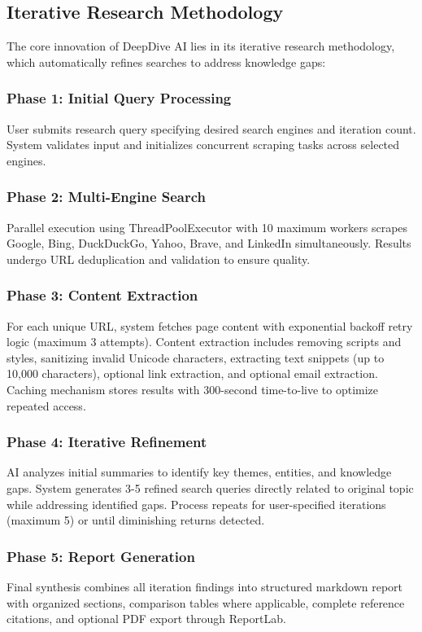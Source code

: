\documentclass[conference]{IEEEtran}
\begin{document}
\subsection{Iterative Research Methodology}

The core innovation of DeepDive AI lies in its iterative research methodology, which automatically refines searches to address knowledge gaps:

\subsubsection{Phase 1: Initial Query Processing}
User submits research query specifying desired search engines and iteration count. System validates input and initializes concurrent scraping tasks across selected engines.

\subsubsection{Phase 2: Multi-Engine Search}
Parallel execution using ThreadPoolExecutor with 10 maximum workers scrapes Google, Bing, DuckDuckGo, Yahoo, Brave, and LinkedIn simultaneously. Results undergo URL deduplication and validation to ensure quality.

\subsubsection{Phase 3: Content Extraction}
For each unique URL, system fetches page content with exponential backoff retry logic (maximum 3 attempts). Content extraction includes removing scripts and styles, sanitizing invalid Unicode characters, extracting text snippets (up to 10,000 characters), optional link extraction, and optional email extraction. Caching mechanism stores results with 300-second time-to-live to optimize repeated access.

\subsubsection{Phase 4: Iterative Refinement}
AI analyzes initial summaries to identify key themes, entities, and knowledge gaps. System generates 3-5 refined search queries directly related to original topic while addressing identified gaps. Process repeats for user-specified iterations (maximum 5) or until diminishing returns detected.

\subsubsection{Phase 5: Report Generation}
Final synthesis combines all iteration findings into structured markdown report with organized sections, comparison tables where applicable, complete reference citations, and optional PDF export through ReportLab.
\end{document}
